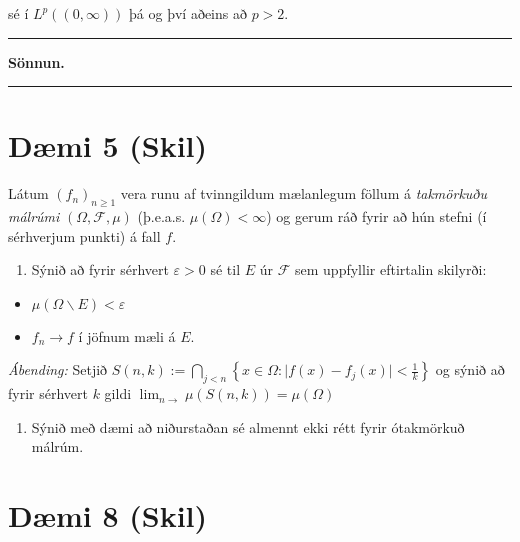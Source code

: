 \documentclass[]{book}
\providecommand{\tightlist}{%
  \setlength{\itemsep}{0pt}\setlength{\parskip}{0pt}}
\begin{document}
sé í \(L^p((0,\infty))\) þá og því aðeins að \(p>2\).

\begin{center}\rule{0.5\linewidth}{\linethickness}\end{center}

\textbf{Sönnun.}

\begin{center}\rule{0.5\linewidth}{\linethickness}\end{center}

\hypertarget{dmi-5-skil-1}{%
\section*{Dæmi 5 (Skil)}\label{dmi-5-skil-1}}

Látum \((f_n)_{n\geq1}\) vera runu af tvinngildum mælanlegum föllum á \emph{takmörkuðu málrúmi} \((\Omega,\mathcal F,\mu)\) (þ.e.a.s. \(\mu(\Omega)<\infty\)) og gerum ráð fyrir að hún stefni (í sérhverjum punkti) á fall \(f\).

\begin{enumerate}
\def\labelenumi{\arabic{enumi}.}
\tightlist
\item
  Sýnið að fyrir sérhvert \(\varepsilon > 0\) sé til \(E\) úr \(\mathcal F\) sem uppfyllir eftirtalin skilyrði:
\end{enumerate}

\begin{itemize}
\tightlist
\item
  \(\mu(\Omega\backslash E) < \varepsilon\)
\item
  \(f_n \rightarrow f\) í jöfnum mæli á \(E\).
\end{itemize}

\emph{Ábending:} Setjið \(S(n,k) := \bigcap_{j<n}\left\{x\in \Omega: \vert f(x) - f_j(x)\vert < \frac1k \right\}\) og sýnið að fyrir sérhvert \(k\) gildi \(\lim_{n\rightarrow}\mu(S(n,k)) = \mu(\Omega)\)

\begin{enumerate}
\def\labelenumi{\arabic{enumi}.}
\setcounter{enumi}{1}
\tightlist
\item
  Sýnið með dæmi að niðurstaðan sé almennt ekki rétt fyrir ótakmörkuð málrúm.
\end{enumerate}

\hypertarget{dmi-8-skil}{%
\section*{Dæmi 8 (Skil)}\label{dmi-8-skil}}
\end{document}
